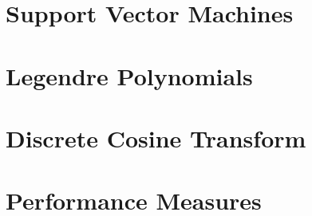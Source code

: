 \documentclass[11pt,a4paper]{tesis}
\begin{document}
	\section{Support Vector Machines}
		
	\section{Legendre Polynomials}
		
	\section{Discrete Cosine Transform}
		
	\section{Performance Measures}
		
\end{document}
